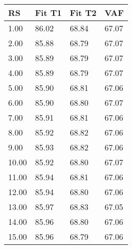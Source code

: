 \begin{tabular}{llll}
RS & Fit T1 & Fit T2 & VAF \\ 
\hline 
 1.00 & 86.02 & 68.84 & 67.07 \\ 
 2.00 & 85.88 & 68.79 & 67.07 \\ 
 3.00 & 85.89 & 68.79 & 67.07 \\ 
 4.00 & 85.89 & 68.79 & 67.07 \\ 
 5.00 & 85.90 & 68.81 & 67.06 \\ 
 6.00 & 85.90 & 68.80 & 67.07 \\ 
 7.00 & 85.91 & 68.81 & 67.06 \\ 
 8.00 & 85.92 & 68.82 & 67.06 \\ 
 9.00 & 85.93 & 68.82 & 67.06 \\ 
10.00 & 85.92 & 68.80 & 67.07 \\ 
11.00 & 85.94 & 68.81 & 67.06 \\ 
12.00 & 85.94 & 68.80 & 67.06 \\ 
13.00 & 85.97 & 68.83 & 67.05 \\ 
14.00 & 85.96 & 68.80 & 67.06 \\ 
15.00 & 85.96 & 68.79 & 67.06 \\ 
\hline 
\end{tabular}